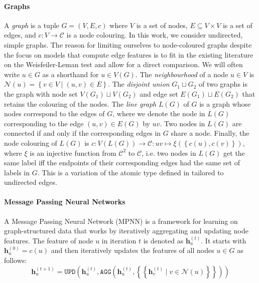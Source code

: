 \documentclass{article}
\newcommand{\set}[1]{\left\{#1\right\}}
\newcommand{\multiset}[1]{\left\{\!\!\left\{#1\right\}\!\!\right\}}
\newcommand{\iter}[1]{^{(#1)}}
\newcommand{\upd}{\texttt{UPD}}
\newcommand{\agg}{\texttt{AGG}}
\newcommand{\initdec}{\xi}
\newcommand{\nbh}{\mathcal{N}}
\newcommand{\bs}[1]{\boldsymbol{#1}}
\newcommand{\feat}{\bs{h}}
\newcommand{\mcc}{\mathcal{C}}
\begin{document}
\paragraph{Graphs}
A \emph{graph} is a tuple $G=(V,E,c)$ where $V$ is a set of nodes, $E\subseteq V\times V$ is a set of edges, and $c: V\rightarrow\mcc$ is a node colouring. In this work, we consider undirected, simple graphs.
The reason for limiting ourselves to node-coloured graphs despite the focus on models that compute edge features is to fit in the existing literature on the Weisfeiler-Leman test and allow for a direct comparison. We will often write $u\in G$ as a shorthand for $u\in V(G)$.
The \emph{neighbourhood} of a node $u\in V$ is $\nbh(u) = \set{v\in V \mid (u,v)\in E}$. The \emph{disjoint union} $G_1 \sqcup G_2$ of two graphs is the graph with node set $V(G_1) \sqcup V(G_2)$ and edge set $E(G_1) \sqcup E(G_2)$ that retains the colouring of the nodes.
The \emph{line graph} $L(G)$ of $G$ is a graph whose nodes correspond to the edges of $G$, where we denote the node in $L(G)$ corresponding to the edge $(u,v)\in E(G)$ by $uv$. Two nodes in $L(G)$ are connected if and only if the corresponding edges in $G$ share a node. Finally, the node colouring of $L(G)$ is $c: V(L(G)) \rightarrow \mcc: uv \mapsto \initdec(\set{c(u),c(v)})$, where $\initdec$ is an injective function from $\mcc^2$ to $\mcc$, i.e. two nodes in $L(G)$ get the same label iff the endpoints of their corresponding edges had the same set of labels in $G$. This is a variation of the atomic type defined in \cite{morris2019weisfeiler} tailored to undirected edges.

\paragraph{Message Passing Neural Networks}
A Message Passing Neural Network (MPNN) \cite{gilmer2017neural} is a framework for learning on graph-structured data that works by iteratively aggregating and updating node features. The feature of node $u$ in iteration $t$ is denoted as $\feat_u\iter{t}$. It starts with $\feat_u\iter{0} = c(u)$ and then iteratively updates the features of all nodes $u\in G$ as follows:
\begin{equation}
    \feat_u\iter{t+1}
    = \upd\left(\feat_u\iter{t},
    \agg\left(\feat_u\iter{t}, \multiset{\feat_v\iter{t} \mid v\in \nbh(u)}\right)\right)
\end{equation}
\end{document}
